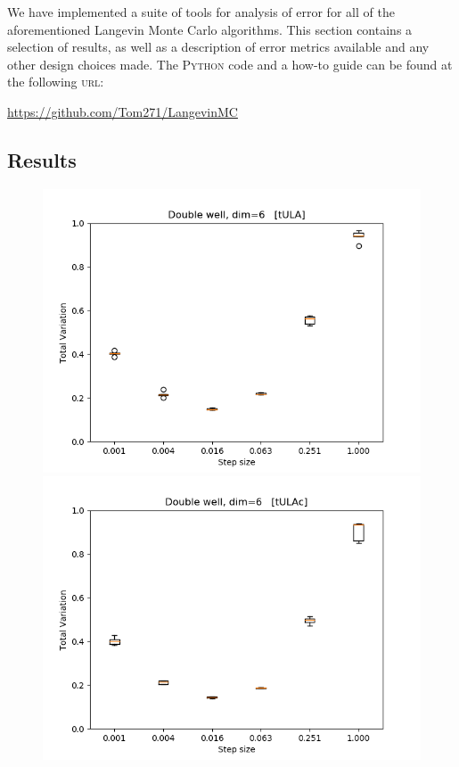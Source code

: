 We have implemented a suite of tools for analysis of error for all of the aforementioned Langevin Monte Carlo algorithms. This section contains a selection of results, as well as a description of error metrics available and any other design choices made. The \textsc{Python} code and a how-to
guide can be found at the following
\textsc{url}: \\

   \centerline{ \url{https://github.com/Tom271/LangevinMC}}


\subsection{Results}


\begin{figure}[H]
\centering
  \begin{minipage}[b]{0.32\textwidth}
  \centering
    \includegraphics[width=\textwidth]{Figures/tula_tv.png}
  \end{minipage} %
  \begin{minipage}[b]{0.32\textwidth}
  \centering
    \includegraphics[width=\textwidth]{Figures/tulac_tv.png}

\end{minipage}
\end{figure}
